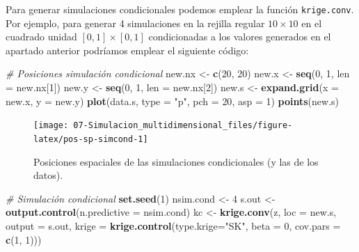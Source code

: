 \documentclass[
]{book}
\newenvironment{Shaded}{\begin{snugshade}}{\end{snugshade}}
\newcommand{\CommentTok}[1]{\textcolor[rgb]{0.56,0.35,0.01}{\textit{#1}}}
\newcommand{\DataTypeTok}[1]{\textcolor[rgb]{0.13,0.29,0.53}{#1}}
\newcommand{\DecValTok}[1]{\textcolor[rgb]{0.00,0.00,0.81}{#1}}
\newcommand{\KeywordTok}[1]{\textcolor[rgb]{0.13,0.29,0.53}{\textbf{#1}}}
\newcommand{\NormalTok}[1]{#1}
\newcommand{\StringTok}[1]{\textcolor[rgb]{0.31,0.60,0.02}{#1}}
\theoremstyle{break}
\theoremstyle{definition}
\theoremstyle{definition}
\theoremstyle{definition}
\theoremstyle{remark}
\begin{document}
Para generar simulaciones condicionales podemos emplear la función \texttt{krige.conv}.
Por ejemplo, para generar 4 simulaciones en la rejilla regular \(10\times10\) en el cuadrado unidad \([0,1] \times [0,1]\) condicionadas a los valores generados en el apartado anterior podríamos emplear el siguiente código:

\begin{Shaded}
\begin{Highlighting}[]
\CommentTok{# Posiciones simulación condicional}
\NormalTok{new.nx <-}\StringTok{ }\KeywordTok{c}\NormalTok{(}\DecValTok{20}\NormalTok{, }\DecValTok{20}\NormalTok{)}
\NormalTok{new.x <-}\StringTok{ }\KeywordTok{seq}\NormalTok{(}\DecValTok{0}\NormalTok{, }\DecValTok{1}\NormalTok{, }\DataTypeTok{len =}\NormalTok{ new.nx[}\DecValTok{1}\NormalTok{])}
\NormalTok{new.y <-}\StringTok{ }\KeywordTok{seq}\NormalTok{(}\DecValTok{0}\NormalTok{, }\DecValTok{1}\NormalTok{, }\DataTypeTok{len =}\NormalTok{ new.nx[}\DecValTok{2}\NormalTok{])}
\NormalTok{new.s <-}\StringTok{ }\KeywordTok{expand.grid}\NormalTok{(}\DataTypeTok{x =}\NormalTok{ new.x, }\DataTypeTok{y =}\NormalTok{ new.y)}
\KeywordTok{plot}\NormalTok{(data.s, }\DataTypeTok{type =} \StringTok{"p"}\NormalTok{, }\DataTypeTok{pch =} \DecValTok{20}\NormalTok{, }\DataTypeTok{asp =} \DecValTok{1}\NormalTok{)}
\KeywordTok{points}\NormalTok{(new.s)}
\end{Highlighting}
\end{Shaded}

\begin{figure}[!htb]

{\centering \texttt{[image: 07-Simulacion\_multidimensional\_files/figure-latex/pos-sp-simcond-1]} 

}

\caption{Posiciones espaciales de las simulaciones condicionales (y las de los datos).}\label{fig:pos-sp-simcond}
\end{figure}

\begin{Shaded}
\begin{Highlighting}[]
\CommentTok{# Simulación condicional}
\KeywordTok{set.seed}\NormalTok{(}\DecValTok{1}\NormalTok{)}
\NormalTok{nsim.cond <-}\StringTok{ }\DecValTok{4}
\NormalTok{s.out <-}\StringTok{ }\KeywordTok{output.control}\NormalTok{(}\DataTypeTok{n.predictive =}\NormalTok{ nsim.cond)}
\NormalTok{kc <-}\StringTok{ }\KeywordTok{krige.conv}\NormalTok{(z, }\DataTypeTok{loc =}\NormalTok{ new.s, }\DataTypeTok{output =}\NormalTok{ s.out,}
                 \DataTypeTok{krige =} \KeywordTok{krige.control}\NormalTok{(}\DataTypeTok{type.krige=}\StringTok{"SK"}\NormalTok{, }\DataTypeTok{beta =} \DecValTok{0}\NormalTok{, }\DataTypeTok{cov.pars =} \KeywordTok{c}\NormalTok{(}\DecValTok{1}\NormalTok{, }\DecValTok{1}\NormalTok{)))}
\end{Highlighting}
\end{Shaded}
\end{document}
